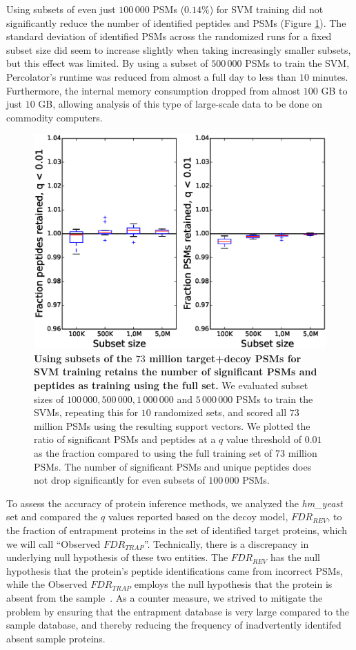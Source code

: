 \documentclass{article}
\begin{document}
Using subsets of even just $100\,000$ PSMs ($0.14\%$) for SVM training
did not significantly reduce the number of identified peptides and
PSMs (Figure \ref{fig:subset}). The standard deviation of identified
PSMs across the randomized runs for a fixed subset size did seem to
increase slightly when taking increasingly smaller subsets, but this
effect was limited. By using a subset of $500\,000$ PSMs to train the
SVM, Percolator's runtime was reduced from almost a full day to less
than $10$ minutes. Furthermore, the internal memory consumption
dropped from almost $100$ GB to just $10$ GB, allowing analysis of
this type of large-scale data to be done on commodity computers.

\begin{figure}[!htp]
\begin{center}
\includegraphics[width=0.6\linewidth]{./img/subset-performance}
\caption{\label{fig:subset}\textbf{Using subsets of the $73$ million
target+decoy PSMs for SVM training retains the number of significant
PSMs and peptides as training using the full set.} We evaluated subset
sizes of $100\,000, 500\,000, 1\,000\,000$ and $5\,000\,000$ PSMs to
train the SVMs, repeating this for $10$ randomized sets, and scored
all $73$ million PSMs using the resulting support vectors. We plotted
the ratio of significant PSMs and peptides at a $q$ value threshold of
$0.01$ as the fraction compared to using the full training set of $73$
million PSMs. The number of significant PSMs and unique peptides does
not drop significantly for even subsets of $100\,000$ PSMs.}
\end{center}
\end{figure}

To assess the accuracy of protein inference methods, we analyzed the
{\em hm\_yeast} set and compared the $q$ values reported based on the
decoy model, $FDR_{REV}$, to the fraction of entrapment proteins in
the set of identified target proteins, which we will call ``Observed
$FDR_{TRAP}$''. Technically, there is a discrepancy in underlying null
hypothesis of these two entities. The $FDR_{REV}$ has the null
hypothesis that the protein's peptide identifications came from
incorrect PSMs, while the Observed $FDR_{TRAP}$ employs the null
hypothesis that the protein is absent from the sample~\cite{the:how}.
As a counter measure, we strived to mitigate the problem by ensuring
that the entrapment database is very large compared to the sample
database, and thereby reducing the frequency of inadvertently
identifed absent sample proteins.
\end{document}
